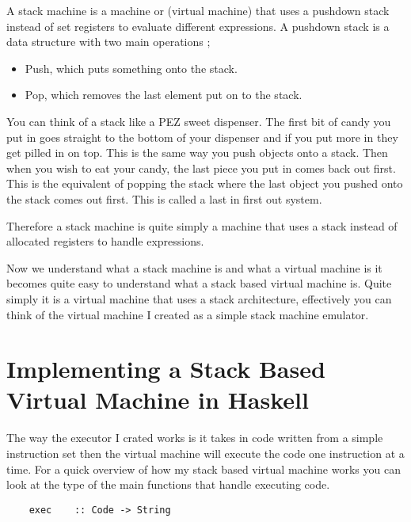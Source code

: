 A stack machine is a machine or (virtual machine) that uses a pushdown stack instead of set registers to evaluate different expressions\footnotemark[3]. A pushdown stack is a data structure with two main operations \cite[p.~232]{IntroAlgo};


\begin{itemize}
\item Push, which puts something onto the stack.
\item Pop, which removes the last element put on to the stack.
\end{itemize} 


You can think of a stack like a PEZ sweet dispenser. The first bit of candy you put in goes straight to the bottom of your dispenser and if you put more in they get pilled in on top. This is the same way you push objects onto a stack. Then when you wish to eat your candy, the last piece you put in comes back out first. This is the equivalent of popping the stack where the last object you pushed onto the stack comes out first. This is called a last in first out system.    


Therefore a stack machine is quite simply a machine that uses a stack instead of allocated registers to handle expressions. 

Now we understand what a stack machine is and what a virtual machine is it becomes quite easy to understand what a stack based virtual machine is. Quite simply it is a virtual machine that uses a stack architecture, effectively you can think of the virtual machine I created as a simple stack machine emulator. 


\section[Implementing a Stack Based Virtual Machine]{Implementing a Stack Based \\ Virtual Machine in Haskell}

The way the executor I crated works is it takes in code written from a simple instruction set then the virtual machine will execute the code one instruction at a time. For a quick overview of how my stack based virtual machine works you can look at the type of the main functions that handle executing code.

\begin{lstlisting}
	exec	:: Code -> String
\end{lstlisting}

